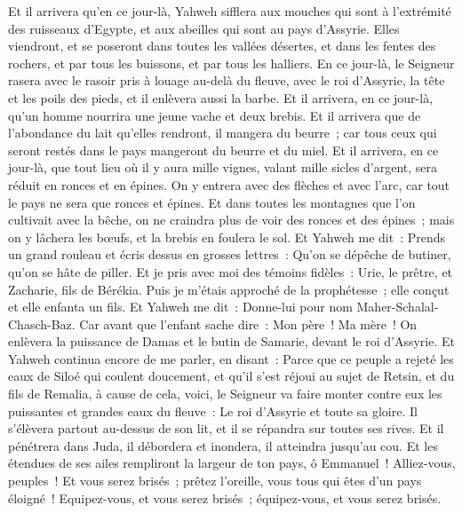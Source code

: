 \begin{multicols}{2}
Et il arrivera qu'en ce jour-là, Yahweh sifflera aux mouches qui sont à l'extrémité des ruisseaux d'Egypte, et aux abeilles qui sont au pays d'Assyrie.
Elles viendront, et se poseront dans toutes les vallées désertes, et dans les fentes des rochers, et par tous les buissons, et par tous les halliers.
En ce jour-là, le Seigneur rasera avec le rasoir pris à louage au-delà du fleuve, avec le roi d'Assyrie, la tête et les poils des pieds, et il enlèvera aussi la barbe.
Et il arrivera, en ce jour-là, qu'un homme nourrira une jeune vache et deux brebis.
Et il arrivera que de l'abondance du lait qu'elles rendront, il mangera du beurre~; car tous ceux qui seront restés dans le pays mangeront du beurre et du miel.
Et il arrivera, en ce jour-là, que tout lieu où il y aura mille vignes, valant mille sicles d'argent, sera réduit en ronces et en épines.
On y entrera avec des flèches et avec l'arc, car tout le pays ne sera que ronces et épines.
Et dans toutes les montagnes que l'on cultivait avec la bêche, on ne craindra plus de voir des ronces et des épines~; mais on y lâchera les bœufs, et la brebis en foulera le sol.
\VerseOne{}Et Yahweh me dit~: Prends un grand rouleau et écris dessus en grosses lettres~: Qu'on se dépêche de butiner, qu'on se hâte de piller.
Et je pris avec moi des témoins fidèles~: Urie, le prêtre, et Zacharie, fils de Bérékia.
Puis je m'étais approché de la prophétesse~; elle conçut et elle enfanta un fils. Et Yahweh me dit~: Donne-lui pour nom Maher-Schalal-Chasch-Baz.
Car avant que l'enfant sache dire~: Mon père~! Ma mère~! On enlèvera la puissance de Damas et le butin de Samarie, devant le roi d'Assyrie.
Et Yahweh continua encore de me parler, en disant~:
Parce que ce peuple a rejeté les eaux de Siloé qui coulent doucement, et qu'il s'est réjoui au sujet de Retsin, et du fils de Remalia,
à cause de cela, voici, le Seigneur va faire monter contre eux les puissantes et grandes eaux du fleuve~: Le roi d'Assyrie et toute sa gloire. Il s'élèvera partout au-dessus de son lit, et il se répandra sur toutes ses rives.
Et il pénétrera dans Juda, il débordera et inondera, il atteindra jusqu'au cou. Et les étendues de ses ailes rempliront la largeur de ton pays, ô Emmanuel~!
Alliez-vous, peuples~! Et vous serez brisés~; prêtez l'oreille, vous tous qui êtes d'un pays éloigné~! Equipez-vous, et vous serez brisés~; équipez-vous, et vous serez brisés.

\end{multicols}
